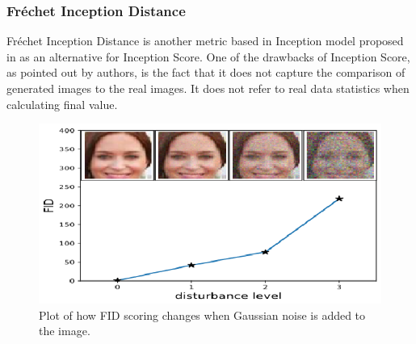 \documentclass[12pt,a4paper,openany]{book}
\begin{document}
%
%
%
%
%

\subsubsection*{Fr\'echet Inception Distance}

Fr\'echet Inception Distance is another metric based in Inception model proposed in \cite{fid} as an alternative for Inception Score. One of the drawbacks of Inception Score, as pointed out by authors, is the fact that it does not capture the comparison of generated images to the real images. It does not refer to real data statistics when calculating final value.


 \begin{figure}[ht!]
     \centering
     \includegraphics[scale=1.6]{figs/fid.eps}
     \caption{Plot of how FID scoring changes when Gaussian noise is added to the image.}\label{Fig:FID}
 \end{figure}
 
\end{document}
